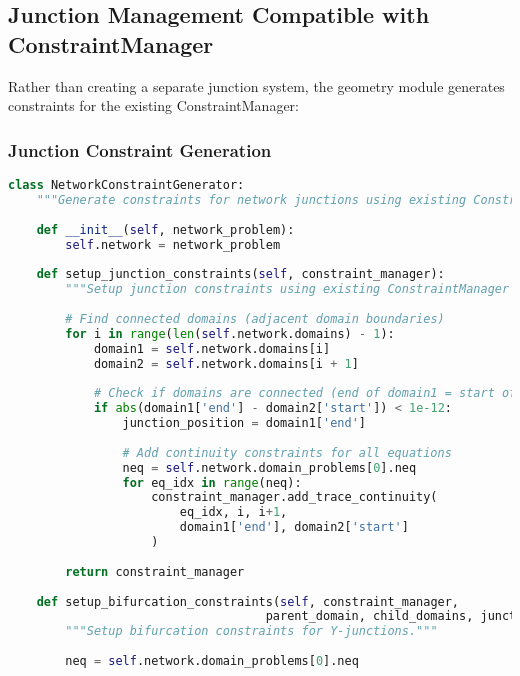 \subsection{Junction Management Compatible with ConstraintManager}
\label{subsec:junction_constraints}

Rather than creating a separate junction system, the geometry module generates constraints for the existing ConstraintManager:

\subsubsection{Junction Constraint Generation}

\begin{lstlisting}[language=Python, caption=Junction Constraint Integration]
class NetworkConstraintGenerator:
    """Generate constraints for network junctions using existing ConstraintManager."""
    
    def __init__(self, network_problem):
        self.network = network_problem
        
    def setup_junction_constraints(self, constraint_manager):
        """Setup junction constraints using existing ConstraintManager API."""
        
        # Find connected domains (adjacent domain boundaries)
        for i in range(len(self.network.domains) - 1):
            domain1 = self.network.domains[i]
            domain2 = self.network.domains[i + 1]
            
            # Check if domains are connected (end of domain1 = start of domain2)
            if abs(domain1['end'] - domain2['start']) < 1e-12:
                junction_position = domain1['end']
                
                # Add continuity constraints for all equations
                neq = self.network.domain_problems[0].neq
                for eq_idx in range(neq):
                    constraint_manager.add_trace_continuity(
                        eq_idx, i, i+1, 
                        domain1['end'], domain2['start']
                    )
        
        return constraint_manager
        
    def setup_bifurcation_constraints(self, constraint_manager, 
                                    parent_domain, child_domains, junction_pos):
        """Setup bifurcation constraints for Y-junctions."""
        
        neq = self.network.domain_problems[0].neq
        

\end{lstlisting}
